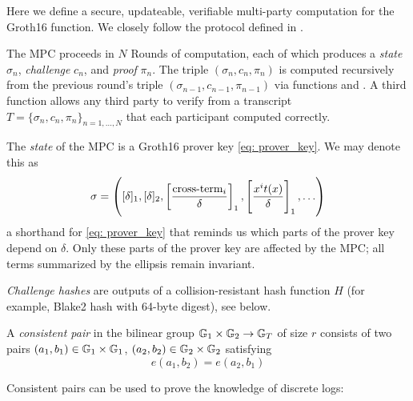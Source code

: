 \label{sec: mpc_def}

Here we define a secure, updateable, verifiable multi-party computation for the Groth16 \Setup{} function. We closely follow the protocol defined in \cite{bowe19}.

The MPC proceeds in $N$ Rounds of computation, each of which produces a \emph{state} $\sigma_n$, \emph{challenge} $c_n$, and \emph{proof} $\pi_n$. The triple $(\sigma_n, c_n, \pi_n)$ is computed recursively from the previous round's triple $(\sigma_{n-1}, c_{n-1}, \pi_{n-1})$ via functions \contribute{} and \challenge{}. A third function \verify{} allows any third party to verify from a transcript $T = \{ \sigma_n, c_n, \pi_n \}_{n=1,\ldots, N}$ that each participant computed \contribute{} correctly. 

\begin{definition}[State]
    The \emph{state} of the MPC is a Groth16 prover key \eqref{eq: prover_key}. We may denote this as 
    \begin{equation}\label{eq: short sigma} \sigma = \left( [\delta]_1, [\delta]_2, \left[\frac{\text{cross-term}_i }{\delta}\right]_1, \left[ \frac{x^i t(x)}{\delta} \right]_1{}{}, \ldots \right) \end{equation} 
    a shorthand for \eqref{eq: prover_key} that reminds us which parts of the prover key depend on $\delta$. Only these parts of the prover key are affected by the MPC; all terms summarized by the ellipsis remain invariant.
\end{definition}

\begin{definition}
    \emph{Challenge hashes} are outputs of a collision-resistant hash function $H$ (for example, Blake2 hash with 64-byte digest), see \challenge{} below.
\end{definition}

\begin{definition}
    A \emph{consistent pair} in the bilinear group $\mathbb{G}_1 \times \mathbb{G}_2 \to \mathbb{G}_T$ of size $r$ consists of two pairs $(a_1, b_1) \in \mathbb{G}_1 \times \mathbb{G}_1 $, $(a_2, b_2) \in \mathbb{G}_2 \times \mathbb{G}_2$ satisfying 
    \begin{equation}\label{eq: ratio}
        e\left( a_1, b_2 \right) = e\left( a_2, b_1\right)
    \end{equation}
\end{definition}
Consistent pairs can be used to prove the knowledge of discrete logs:

